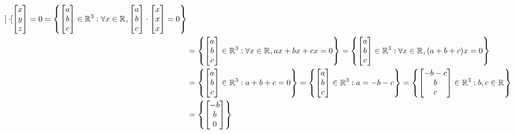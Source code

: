 \begin{solution}
\begin{align*}
{\begin{bmatrix}
		\end{bmatrix}
		\cdot
		\begin{bmatrix}
			x \\ y \\ z
		\end{bmatrix}
		= 0
		}=\set{
		\begin{bmatrix}
			a \\ b \\ c
		\end{bmatrix}
		\in\rmath[3]:\forall x\in\rmath,
		\begin{bmatrix}
			a \\ b \\ c
		\end{bmatrix}
		\cdot
		\begin{bmatrix}
			x \\ x \\ x
		\end{bmatrix}
		= 0
		}\\
		&=\set{
		\begin{bmatrix}
			a \\ b \\ c
		\end{bmatrix}
		\in\rmath[3]:\forall x\in\rmath, ax + bx + cx= 0
		}=\set{
		\begin{bmatrix}
			a \\ b \\ c
		\end{bmatrix}
		\in\rmath[3]:\forall x\in\rmath, (a + b + c)x= 0
		}\\
		&=\set{
		\begin{bmatrix}
			a \\ b \\ c
		\end{bmatrix}
		\in\rmath[3]:a + b + c = 0
		}=\set{
		\begin{bmatrix}
			a \\ b \\ c
		\end{bmatrix}
		\in\rmath[3]:a = -b - c
		}=\set{
		\begin{bmatrix}
			-b - c \\ b \\ c
		\end{bmatrix}
		\in\rmath[3]: b, c\in\rmath
		}\\
		&=\set{
		\begin{bmatrix}
			-b \\ b \\ 0
		\end{bmatrix}
}
\end{align*}
\end{solution}
